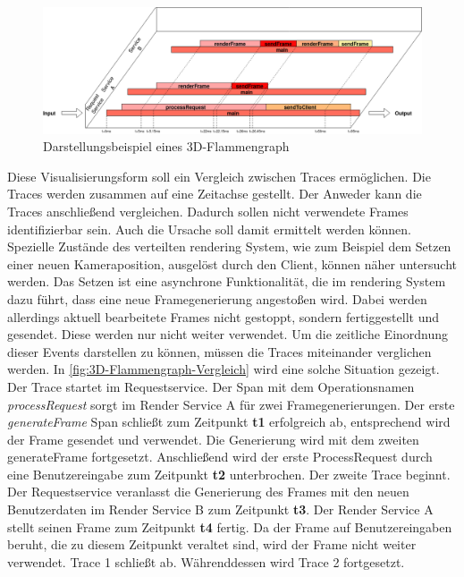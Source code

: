 \begin{figure}[!ht]
	\centering
	\hspace*{-2cm}  
	\includegraphics[scale=0.36]{img/Design/3D-Flammengraph-Konzept.png}
	\caption[Darstellungsbeispiel eines 3D-Flammengraph ]{ Darstellungsbeispiel eines 3D-Flammengraph}
	\label{fig:3D-Flammengraph-Konzept}
\end{figure}

Diese Visualisierungsform soll ein Vergleich zwischen Traces ermöglichen. Die Traces werden zusammen auf eine Zeitachse gestellt. Der Anweder kann die Traces anschließend vergleichen. Dadurch sollen nicht verwendete Frames identifizierbar sein. Auch die Ursache soll damit ermittelt werden können. Spezielle Zustände des verteilten rendering System, wie zum Beispiel dem Setzen einer neuen Kameraposition, ausgelöst durch den Client, können näher untersucht werden. Das Setzen ist eine asynchrone Funktionalität, die im rendering System dazu führt, dass eine neue Framegenerierung angestoßen wird. Dabei werden allerdings aktuell bearbeitete Frames nicht gestoppt, sondern fertiggestellt und gesendet. Diese werden nur nicht weiter verwendet. Um die zeitliche Einordnung dieser Events darstellen zu können, müssen die Traces miteinander verglichen werden. In \cref{fig:3D-Flammengraph-Vergleich} wird eine solche Situation gezeigt. Der Trace startet im Requestservice. Der Span mit dem Operationsnamen \emph{processRequest} sorgt im Render Service A für zwei Framegenerierungen. Der erste \emph{generateFrame} Span schließt zum Zeitpunkt \textbf{t1} erfolgreich ab, entsprechend wird der Frame gesendet und verwendet. Die Generierung wird mit dem zweiten generateFrame fortgesetzt. Anschließend wird der erste ProcessRequest durch eine Benutzereingabe zum Zeitpunkt \textbf{t2} unterbrochen. Der zweite Trace beginnt. Der Requestservice veranlasst die Generierung des Frames mit den neuen Benutzerdaten im Render Service B zum Zeitpunkt \textbf{t3}. Der Render Service A stellt seinen Frame zum Zeitpunkt \textbf{t4} fertig. Da der Frame auf Benutzereingaben beruht, die zu diesem Zeitpunkt veraltet sind, wird der Frame nicht weiter verwendet. Trace 1 schließt ab. Währenddessen wird Trace 2 fortgesetzt.

